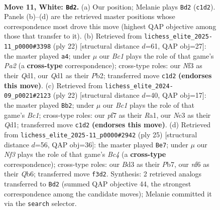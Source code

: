 \documentclass[11pt]{article}
\begin{document}
\clearpage

\begin{figure}[p]\centering
\begin{subfigure}{0.46\textwidth}\centering
\resizebox{\linewidth}{!}{%
\newchessgame
\chessboard[
  setfen={rnb2rk1/1p3ppp/p3pn2/2q5/1b6/2NBPN2/PP3PPP/R1BQ1RK1 w - - 2 11},
  showmover=false,
  pgfstyle=straightmove, color=movearrow, markmove={c1-d2}
]}
\caption{}
\end{subfigure}\hfill
\begin{subfigure}{0.46\textwidth}\centering
\resizebox{\linewidth}{!}{%
\newchessgame
\chessboard[
  setfen={r4rk1/pp2ppbp/1qp2np1/8/3P2bP/2P2N2/PP2BPP1/R1BQ1RK1 w - - 4 12},
  showmover=false,
  pgfstyle=straightmove, color=movearrow, markmove={a2-a4}
]}
\caption{}
\end{subfigure}
\\[4pt]
\begin{subfigure}{0.46\textwidth}\centering
\resizebox{\linewidth}{!}{%
\newchessgame
\chessboard[
  setfen={rnbq1rk1/1p2bppp/p3pn2/8/1PB5/P1N1PN2/5PPP/R1BQ1RK1 w - - 1 12},
  showmover=false,
  pgfstyle=straightmove, color=movearrow, markmove={c1-b2}
]}
\caption{}
\end{subfigure}\hfill
\begin{subfigure}{0.46\textwidth}\centering
\resizebox{\linewidth}{!}{%
\newchessgame
\chessboard[
  setfen={r4rk1/pp3ppp/1qn2n2/2b3B1/6b1/P1N1PN2/1PQ2PPP/R3KB1R b KQ - 2 13},
  showmover=false,
  pgfstyle=straightmove, color=movearrow, markmove={c5-e7}
]}
\caption{}
\end{subfigure}
\caption{\textbf{Move 11, White: \texttt{Bd2}.} (a) Our position; Melanie plays \texttt{Bd2} (\texttt{c1d2}). Panels (b)--(d) are the retrieved master positions whose correspondence most drove this move (highest QAP objective among those that transfer to it). (b) Retrieved from \texttt{lichess\_elite\_2025-11\_p0000\#3398} (ply 22) [structural distance $d$=61, QAP obj=27]: the master played \texttt{a4}; under $\mu$ our \emph{Bc1} plays the role of that game's \emph{Pa2} (a \textbf{cross-type} correspondence); cross-type roles: our \emph{N}f3 as their \emph{Q}d1, our \emph{Q}d1 as their \emph{P}b2; transferred move \texttt{c1d2} \textbf{(endorses this move)}. (c) Retrieved from \texttt{lichess\_elite\_2024-09\_p0021\#2123} (ply 22) [structural distance $d$=40, QAP obj=17]: the master played \texttt{Bb2}; under $\mu$ our \emph{Bc1} plays the role of that game's \emph{Bc1}; cross-type roles: our \emph{p}f7 as their \emph{R}a1, our \emph{N}c3 as their \emph{Q}d1; transferred move \texttt{c1d2} \textbf{(endorses this move)}. (d) Retrieved from \texttt{lichess\_elite\_2025-11\_p0000\#2942} (ply 25) [structural distance $d$=56, QAP obj=36]: the master played \texttt{Be7}; under $\mu$ our \emph{Nf3} plays the role of that game's \emph{Bc4} (a \textbf{cross-type} correspondence); cross-type roles: our \emph{B}d3 as their \emph{P}b7, our \emph{n}f6 as their \emph{Q}b6; transferred move \texttt{f3d2}. Synthesis: 2 retrieved analogs transferred to \texttt{Bd2} (summed QAP objective 44, the strongest correspondence among the candidate moves); Melanie committed it via the \texttt{search} selector.}
\label{fig:thought-m20}
\end{figure}
\end{document}
